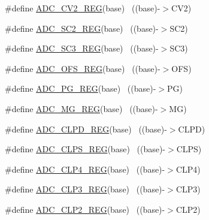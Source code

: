 \begin{DoxyCompactItemize}
\item 
\#define \hyperlink{group___a_d_c___register___accessor___macros_ga9f977af3e7e4f2a9840761e0b789edfa}{A\+D\+C\+\_\+\+C\+V2\+\_\+\+R\+EG}(base)                                            ~((base)-\/$>$C\+V2)
\item 
\#define \hyperlink{group___a_d_c___register___accessor___macros_ga59320fe45b43cd7adf0432961b7fd878}{A\+D\+C\+\_\+\+S\+C2\+\_\+\+R\+EG}(base)                                            ~((base)-\/$>$S\+C2)
\item 
\#define \hyperlink{group___a_d_c___register___accessor___macros_ga3ad2d8654c9403859753d71eb1ff0f6e}{A\+D\+C\+\_\+\+S\+C3\+\_\+\+R\+EG}(base)                                            ~((base)-\/$>$S\+C3)
\item 
\#define \hyperlink{group___a_d_c___register___accessor___macros_ga4b4fbf29b89f142f123aed9b97f55266}{A\+D\+C\+\_\+\+O\+F\+S\+\_\+\+R\+EG}(base)                                            ~((base)-\/$>$O\+FS)
\item 
\#define \hyperlink{group___a_d_c___register___accessor___macros_ga4d97338d7454f7bdaf0b5167c29729c3}{A\+D\+C\+\_\+\+P\+G\+\_\+\+R\+EG}(base)                                              ~((base)-\/$>$PG)
\item 
\#define \hyperlink{group___a_d_c___register___accessor___macros_ga92ad06b46539182e739c15a332939dbd}{A\+D\+C\+\_\+\+M\+G\+\_\+\+R\+EG}(base)                                              ~((base)-\/$>$MG)
\item 
\#define \hyperlink{group___a_d_c___register___accessor___macros_gabae1662b235397e7a388ff36e00f732e}{A\+D\+C\+\_\+\+C\+L\+P\+D\+\_\+\+R\+EG}(base)                                          ~((base)-\/$>$C\+L\+PD)
\item 
\#define \hyperlink{group___a_d_c___register___accessor___macros_ga482119bbb8a6c40285b6999d6a88d76a}{A\+D\+C\+\_\+\+C\+L\+P\+S\+\_\+\+R\+EG}(base)                                          ~((base)-\/$>$C\+L\+PS)
\item 
\#define \hyperlink{group___a_d_c___register___accessor___macros_ga2722b8710cc4793af32d1ca062749691}{A\+D\+C\+\_\+\+C\+L\+P4\+\_\+\+R\+EG}(base)                                          ~((base)-\/$>$C\+L\+P4)
\item 
\#define \hyperlink{group___a_d_c___register___accessor___macros_gad3369cf8ea89b61e025a00e28e48d878}{A\+D\+C\+\_\+\+C\+L\+P3\+\_\+\+R\+EG}(base)                                          ~((base)-\/$>$C\+L\+P3)
\item 
\#define \hyperlink{group___a_d_c___register___accessor___macros_gaf76097bf0d35aba4eb24772209ca9088}{A\+D\+C\+\_\+\+C\+L\+P2\+\_\+\+R\+EG}(base)                                          ~((base)-\/$>$C\+L\+P2)

\end{DoxyCompactItemize}
